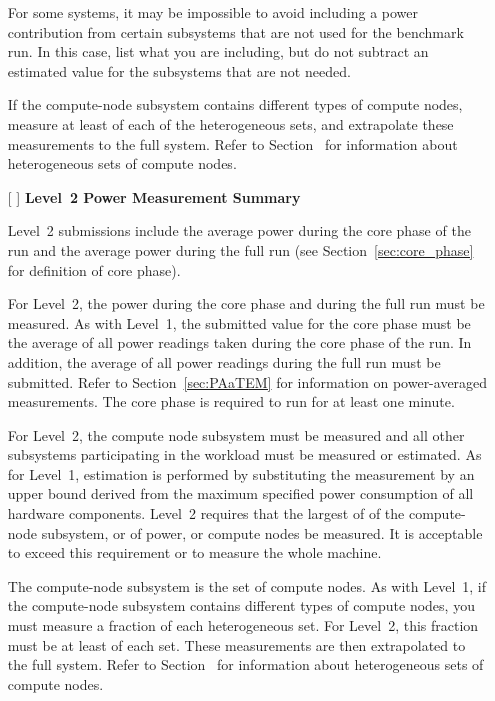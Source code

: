 \begin{itemize}
For some systems, it may be impossible to avoid including a power contribution from certain subsystems that are not used for the benchmark run.
In this case, list what you are including, but do not subtract an estimated value for the subsystems that are not needed.

If the compute-node subsystem contains different types of compute nodes, measure at least \SpecFracMinLOne{} of each of the heterogeneous sets, and extrapolate these measurements to the full system.
Refer to Section~ for information about heterogeneous sets of compute nodes.

\item[{[ ]}]
\textbf{Level~2 Power Measurement Summary}

Level~2 submissions include the average power during the core phase of the run and the average power during the full run (see Section~\ref{sec:core_phase} for definition of core phase).

For Level~2, the power during the core phase and during the full run must be measured.
As with Level~1, the submitted value for the core phase must be the average of all power readings taken during the core phase of the run.
In addition, the average of all power readings during the full run must be submitted.
Refer to Section~\ref{sec:PAaTEM} for information on power-averaged measurements.
The core phase is required to run for at least one minute.

For Level~2, the compute node subsystem must be measured and all other subsystems participating in the workload must be measured or estimated.
As for Level~1, estimation is performed by substituting the measurement by an upper bound derived from the maximum specified power consumption of all hardware components.
Level~2 requires that the largest of \SpecFracMinLTwo{} of the compute-node subsystem, or \SpecPowerMinLTwo{} of power, or \SpecMinNodes{} compute nodes be measured.
It is acceptable to exceed this requirement or to measure the whole machine.

The compute-node subsystem is the set of compute nodes.
As with Level~1, if the compute-node subsystem contains different types of compute nodes, you must measure a fraction of each heterogeneous set.
For Level~2, this fraction must be at least \SpecFracMinLTwo{} of each set.
These measurements are then extrapolated to the full system.
Refer to Section~ for information about heterogeneous sets of compute nodes.


\end{itemize}
